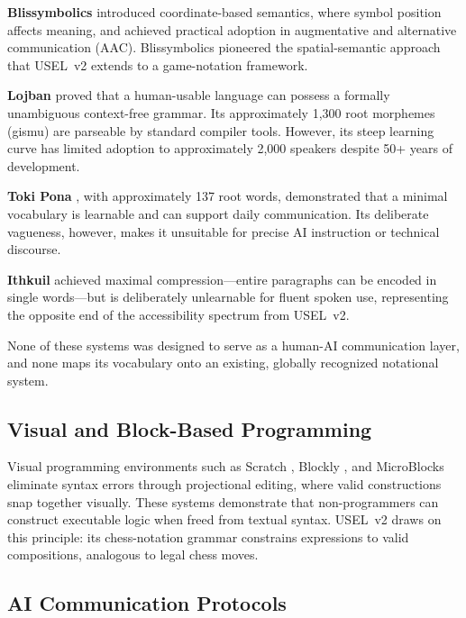 \documentclass[11pt,a4paper]{article}
\begin{document}
\textbf{Blissymbolics} \citep{bliss1965semantography} introduced coordinate-based semantics, where symbol position affects meaning, and achieved practical adoption in augmentative and alternative communication (AAC). Blissymbolics pioneered the spatial-semantic approach that USEL~v2 extends to a game-notation framework.

\textbf{Lojban} \citep{cowan1997complete} proved that a human-usable language can possess a formally unambiguous context-free grammar. Its approximately 1,300 root morphemes (gismu) are parseable by standard compiler tools. However, its steep learning curve has limited adoption to approximately 2,000 speakers despite 50+ years of development.

\textbf{Toki Pona} \citep{lang2014toki}, with approximately 137 root words, demonstrated that a minimal vocabulary is learnable and can support daily communication. Its deliberate vagueness, however, makes it unsuitable for precise AI instruction or technical discourse.

\textbf{Ithkuil} \citep{quijada2004ithkuil} achieved maximal compression---entire paragraphs can be encoded in single words---but is deliberately unlearnable for fluent spoken use, representing the opposite end of the accessibility spectrum from USEL~v2.

None of these systems was designed to serve as a human-AI communication layer, and none maps its vocabulary onto an existing, globally recognized notational system.

\subsection{Visual and Block-Based Programming}
\label{sec:visual-programming}

Visual programming environments such as Scratch \citep{resnick2009scratch}, Blockly \citep{pasternak2017blockly}, and MicroBlocks \citep{maloney2019microblocks} eliminate syntax errors through projectional editing, where valid constructions snap together visually. These systems demonstrate that non-programmers can construct executable logic when freed from textual syntax. USEL~v2 draws on this principle: its chess-notation grammar constrains expressions to valid compositions, analogous to legal chess moves.

\subsection{AI Communication Protocols}
\label{sec:ai-protocols}
\end{document}
